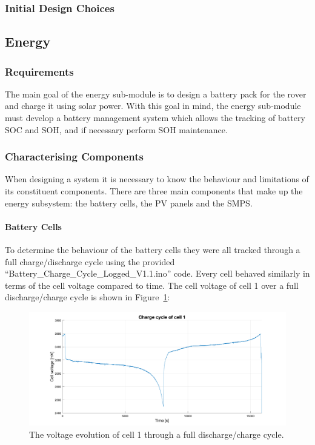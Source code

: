 \documentclass[a4paper]{article}
\begin{document}
\subsubsection{Initial Design Choices}


\subsection{Energy}
\subsubsection{Requirements}

The main goal of the energy sub-module is to design a battery pack for the 
rover and charge it using solar power. With this goal in mind, the energy 
sub-module must develop a battery management system which allows the tracking 
of battery SOC and SOH, and if necessary perform SOH maintenance.         


\subsubsection{Characterising Components}
When designing a system it is necessary to know the behaviour and limitations of its
constituent components. There are three main components that make up the energy 
subsystem: the battery cells, the PV panels and the SMPS.

\paragraph*{Battery Cells}
To determine the behaviour of the battery cells they were all tracked through a full charge/discharge 
cycle using the provided “Battery\_Charge\_Cycle\_Logged\_V1.1.ino” code\cite{chargeCode}. 
Every cell behaved similarly in terms of the cell voltage compared to time. 
The cell voltage of cell 1 over a full discharge/charge cycle is shown in Figure~\ref{fig:charge_cycle}:

\begin{figure}[H]
    \centering
    \includegraphics[scale=0.18]{charge_cycle.png}
    \caption{The voltage evolution of cell 1 through a full discharge/charge cycle.}
    \label{fig:charge_cycle}
\end{figure}
\end{document}
